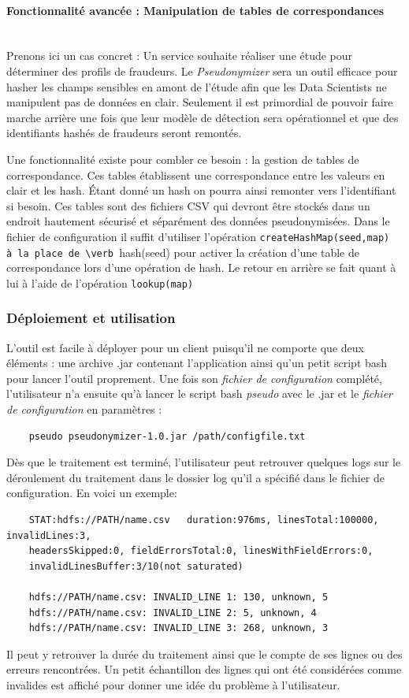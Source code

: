 \documentclass[12pt]{report}
\newcommand{\namedparagraph}[1]{\paragraph*{#1}\mbox{}\\}
\begin{document}
	\namedparagraph{Fonctionnalité avancée : Manipulation de tables de correspondances}
	Prenons ici un cas concret : Un service souhaite réaliser une étude pour déterminer des profils de fraudeurs. Le \textit{Pseudonymizer} sera un outil efficace pour hasher les champs sensibles en amont de l'étude afin que les Data Scientists ne manipulent pas de données en clair. Seulement il est primordial de pouvoir faire marche arrière une fois que leur modèle de détection sera opérationnel et que des identifiants hashés de fraudeurs seront remontés. 
	
	Une fonctionnalité existe pour combler ce besoin : la gestion de tables de correspondance. Ces tables établissent une correspondance entre les valeurs en clair et les hash. Étant donné un hash on pourra ainsi remonter vers l'identifiant si besoin. Ces tables sont des fichiers CSV qui devront être stockés dans un endroit hautement sécurisé et séparément des données pseudonymisées. Dans le fichier de configuration il suffit d'utiliser l'opération \verb .createHashMap(seed,map)  à la place de \verb .hash(seed)  pour activer la création d'une table de correspondance lors d'une opération de hash. Le retour en arrière se fait quant à lui à l'aide de l'opération \verb .lookup(map) .
	\subsubsection{Déploiement et utilisation}
	L'outil est facile à déployer pour un client puisqu'il ne comporte que deux éléments : une archive .jar contenant l'application ainsi qu'un petit script bash pour lancer l'outil proprement.
	Une fois son \textit{fichier de configuration} complété, l'utilisateur n'a ensuite qu'à lancer le script bash \textit{pseudo} avec le .jar et le \textit{fichier de configuration} en paramètres :\newline
	\begin{lstlisting}
	pseudo pseudonymizer-1.0.jar /path/configfile.txt
	\end{lstlisting}
	
	Dès que le traitement est terminé, l'utilisateur peut retrouver quelques logs sur le déroulement du traitement dans le dossier log qu'il a spécifié dans le fichier de configuration. En voici un exemple:
	
	\begin{verbatim}
	STAT:hdfs://PATH/name.csv	duration:976ms, linesTotal:100000, invalidLines:3,
	headersSkipped:0, fieldErrorsTotal:0, linesWithFieldErrors:0,
	invalidLinesBuffer:3/10(not saturated)
	
	hdfs://PATH/name.csv: INVALID_LINE 1: 130, unknown, 5
	hdfs://PATH/name.csv: INVALID_LINE 2: 5, unknown, 4
	hdfs://PATH/name.csv: INVALID_LINE 3: 268, unknown, 3
	\end{verbatim}
	Il peut y retrouver la durée du traitement ainsi que le compte de ses lignes ou des erreurs rencontrées. Un petit échantillon des lignes qui ont été considérées comme invalides est affiché pour donner une idée du problème à l'utilisateur.
	
\end{document}
